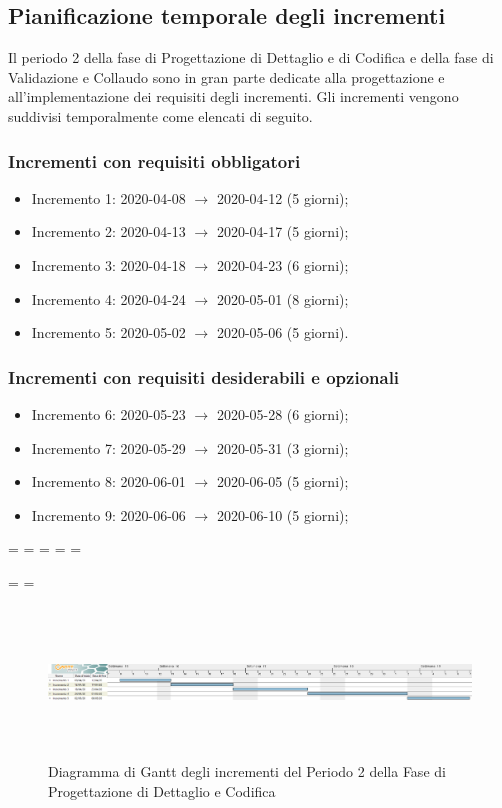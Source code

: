 \subsection{Pianificazione temporale degli incrementi}
Il periodo 2 della fase di Progettazione di Dettaglio e di Codifica e della fase di Validazione e Collaudo sono in gran parte dedicate alla progettazione e all'implementazione dei requisiti degli incrementi.
Gli incrementi vengono suddivisi temporalmente come elencati di seguito.

\subsubsection{Incrementi con requisiti obbligatori}
\begin{itemize}
	\item Incremento 1: 2020-04-08 $\rightarrow$ 2020-04-12 (5 giorni);
	\item Incremento 2: 2020-04-13 $\rightarrow$ 2020-04-17 (5 giorni);
	\item Incremento 3: 2020-04-18 $\rightarrow$ 2020-04-23 (6 giorni);
	\item Incremento 4: 2020-04-24 $\rightarrow$ 2020-05-01 (8 giorni);
	\item Incremento 5: 2020-05-02 $\rightarrow$ 2020-05-06 (5 giorni).
\end{itemize}

\subsubsection{Incrementi con requisiti desiderabili e opzionali}
\begin{itemize}
	\item Incremento 6: 2020-05-23 $\rightarrow$ 2020-05-28 (6 giorni);
	\item Incremento 7: 2020-05-29 $\rightarrow$ 2020-05-31 (3 giorni);
	\item Incremento 8: 2020-06-01 $\rightarrow$ 2020-06-05 (5 giorni);
	\item Incremento 9: 2020-06-06 $\rightarrow$ 2020-06-10 (5 giorni);
\end{itemize}

\newpage
\paperwidth=\pdfpageheight
\paperheight=\pdfpagewidth
\pdfpageheight=\paperheight
\pdfpagewidth=\paperwidth
\headwidth=\textheight

\begingroup 
\vsize=\textwidth
\hsize=\textheight

\pagestyle{empty}
\begin{figure}[h]
	\centering
	\includegraphics[height = 4cm, width = 24.5cm]{Sezioni/Immagini/DiagrammiGantt/PianificazioneTemporaleIncrementi.png}
	\caption{Diagramma di Gantt degli incrementi del Periodo 2 della Fase di Progettazione di Dettaglio e Codifica}
\end{figure}

